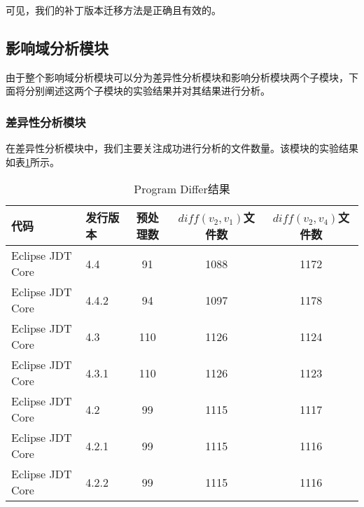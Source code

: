 可见，我们的补丁版本迁移方法是正确且有效的。

%
%

\subsection{影响域分析模块}

由于整个影响域分析模块可以分为差异性分析模块和影响分析模块两个子模块，下面将分别阐述这两个子模块的实验结果并对其结果进行分析。

\subsubsection{差异性分析模块}

在差异性分析模块中，我们主要关注成功进行分析的文件数量。该模块的实验结果如表\ref {data_differ_1}所示。

\begin{table}[H]
	\caption{Program Differ结果}
	\label{data_differ_1}
	\centering
	\begin{tabular}{llccc}
		\toprule[1.5pt]
		{\heiti 代码} & {\heiti 发行版本} & {\heiti 预处理数} & {\heiti $diff(v_2,v_1)$文件数} & {\heiti $diff(v_2,v_4)$文件数} \\\midrule[1pt]
		Eclipse JDT Core & 4.4	& 91 & 1088 & 1172	\\		
		Eclipse JDT Core & 4.4.2 & 94 & 1097 & 1178		\\
		Eclipse JDT Core & 4.3 	& 110 & 1126 & 1124			\\
		Eclipse JDT Core & 4.3.1 & 110 & 1126 & 1123			\\
		Eclipse JDT Core & 4.2 	& 99 & 1115 & 1117		\\
		Eclipse JDT Core & 4.2.1 & 99 & 1115 & 1116			\\
		Eclipse JDT Core & 4.2.2 & 99 & 1115 & 1116		\\
		\bottomrule[1.5pt]
	\end{tabular}
\end{table}


